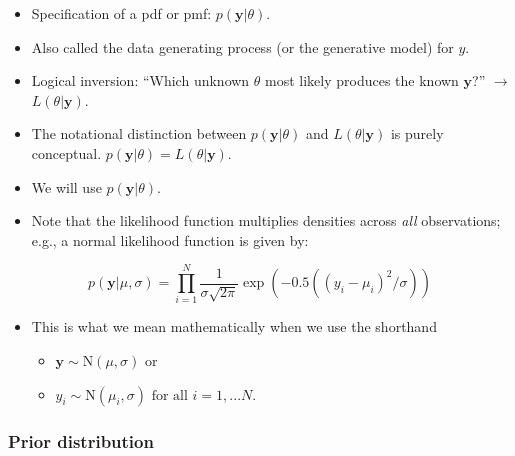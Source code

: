 \documentclass[
  11pt,
]{article}
\providecommand{\tightlist}{%
  \setlength{\itemsep}{0pt}\setlength{\parskip}{0pt}}
\begin{document}
\begin{itemize}
\tightlist
\item
  Specification of a pdf or pmf: \(p(\mathbf{y}|\theta)\).
\item
  Also called the data generating process (or the generative model) for \(y\).
\item
  Logical inversion: ``Which unknown \(\theta\) most likely produces the known \(\mathbf{y}\)?'' \(\rightarrow\) \(L(\theta | \mathbf{y})\).
\item
  The notational distinction between \(p(\mathbf{y}|\theta)\) and \(L(\theta | \mathbf{y})\) is purely conceptual. \(p(\mathbf{y}|\theta) = L(\theta | \mathbf{y})\).
\item
  We will use \(p(\mathbf{y}|\theta)\).
\item
  Note that the likelihood function multiplies densities across \emph{all} observations; e.g., a normal likelihood function is given by:
\end{itemize}

\[p(\mathbf{y}|\mu, \sigma) = \prod_{i=1}^{N} \frac{1}{\sigma \sqrt{2 \pi}} \exp\left(- 0.5 \left( (y_i - \mu_i)^2 / \sigma \right) \right)\]

\begin{itemize}
\tightlist
\item
  This is what we mean mathematically when we use the shorthand

  \begin{itemize}
  \tightlist
  \item
    \(\mathbf{y} \sim \text{N}(\mu, \sigma)\) or
  \item
    \(y_i \sim \text{N}(\mu_i, \sigma) \text{ for all } i=1,...N\).
  \end{itemize}
\end{itemize}

\hypertarget{prior-distribution}{%
\subsubsection{Prior distribution}\label{prior-distribution}}
\end{document}
